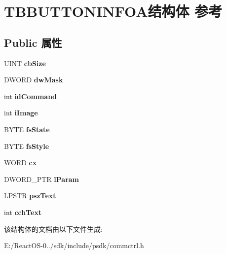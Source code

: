 \hypertarget{struct_t_b_b_u_t_t_o_n_i_n_f_o_a}{}\section{T\+B\+B\+U\+T\+T\+O\+N\+I\+N\+F\+O\+A结构体 参考}
\label{struct_t_b_b_u_t_t_o_n_i_n_f_o_a}
\subsection*{Public 属性}
\begin{DoxyCompactItemize}
\item 
\mbox{\label{struct_t_b_b_u_t_t_o_n_i_n_f_o_a_a614ffdc17cfaf0003af33510c58b918e}} 
U\+I\+NT {\bfseries cb\+Size}
\item 
\mbox{\label{struct_t_b_b_u_t_t_o_n_i_n_f_o_a_af643960e4e0a17bab30a3287aa031ac2}} 
D\+W\+O\+RD {\bfseries dw\+Mask}
\item 
\mbox{\label{struct_t_b_b_u_t_t_o_n_i_n_f_o_a_a30021d0f505d806b75064be3da83fdae}} 
int {\bfseries id\+Command}
\item 
\mbox{\label{struct_t_b_b_u_t_t_o_n_i_n_f_o_a_ac456158ff816b880e1759ea0ffe072e4}} 
int {\bfseries i\+Image}
\item 
\mbox{\label{struct_t_b_b_u_t_t_o_n_i_n_f_o_a_aa0e6aa25cf6e9417fafeca734bf5f442}} 
B\+Y\+TE {\bfseries fs\+State}
\item 
\mbox{\label{struct_t_b_b_u_t_t_o_n_i_n_f_o_a_a6fb518700b6fb4596b035649e5b6f2e1}} 
B\+Y\+TE {\bfseries fs\+Style}
\item 
\mbox{\label{struct_t_b_b_u_t_t_o_n_i_n_f_o_a_a6962d395537a2218e29eae6ae78a9109}} 
W\+O\+RD {\bfseries cx}
\item 
\mbox{\label{struct_t_b_b_u_t_t_o_n_i_n_f_o_a_abdefe6641807b629bb698ffbd54d0e68}} 
D\+W\+O\+R\+D\+\_\+\+P\+TR {\bfseries l\+Param}
\item 
\mbox{\label{struct_t_b_b_u_t_t_o_n_i_n_f_o_a_a875e49bda293387f7c6ced2d2533e677}} 
L\+P\+S\+TR {\bfseries psz\+Text}
\item 
\mbox{\label{struct_t_b_b_u_t_t_o_n_i_n_f_o_a_a3aa29abe5f5b141587a2b2043ee7dedc}} 
int {\bfseries cch\+Text}
\end{DoxyCompactItemize}


该结构体的文档由以下文件生成\+:\begin{DoxyCompactItemize}
\item 
E\+:/\+React\+O\+S-\/0../sdk/include/psdk/commctrl.\+h\end{DoxyCompactItemize}
